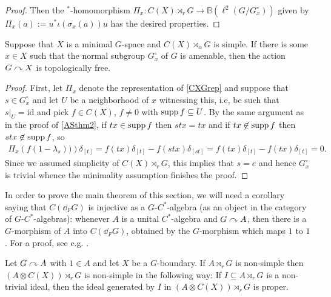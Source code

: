 \begin{proof}
Then the $^*$-homomorphism $\Pi_x \colon C(X) \rtimes_r G \to \mathbb{B}(\ell^2(G/G_x^\circ))$ given by $\Pi_x(a) := u^* \iota(\sigma_x(a)) u $ has the desired properties.
\end{proof}
\begin{proposition}
	Suppose that $X$ is a minimal $G$-space and $C(X) \rtimes_\alpha G$ is simple. If there is some $x \in X$ such that the normal subgroup $G_x^\circ$ of $G$ is amenable, then the action $G \stackrel{ }{\curvearrowright} X$ is topologically free. 
	\label{ozawa15pt2}
\end{proposition}
\begin{proof}
	First, let $\Pi_x$ denote the representation of \cref{CXGrep} and suppose that $s \in G_x^\circ$ and let $U$ be a neighborhood of $x$ witnessing this, i.e, be such that $s|_U = \mathrm{id}$ and pick $f \in C(X)$, $f \neq 0$ with $\operatorname{supp} f \subseteq U$. By the same argument as in the proof of \cref{ASthm2}, if $tx \in \operatorname{supp} f$ then $stx=tx$ and if $tx \not \in \operatorname{supp} f$ then $stx \not \in \operatorname{supp} f$, so
	\begin{align*}
		\Pi_x\left(f ( 1-\lambda_s)) \right) \delta_{[t]} = f(tx) \delta_{[t]} -f(stx) \delta_{[st]} = f(tx) \delta_{[t]} - f(tx)\delta_{[t]} = 0.
	\end{align*}
	Since we assumed simplicity of $C(X) \rtimes_r G$, this implies that $s = e$ and hence $G_x^\circ $ is trivial whence the minimality assumption finishes the proof.
\end{proof}
\begin{note}
	In order to prove the main theorem of this section, we will need a corollary saying that $C(\dd _F G)$ is injective as a $G$-$C^*$-algebra (as an object in the category of $G$-$C^*$-algebras): whenever $A$ is a unital $C^*$-algebra and $G \stackrel{}{\curvearrowright} A$, then there is a $G$-morphism of $A$ into $C(\dd_F G)$, obtained by the $G$-morphism which maps $1$ to $1$. For a proof, see e.g. \cite[Theorem 6 + Corollary 7]{ozawa2014lecture}.
\end{note}
\begin{proposition}
	Let $G \stackrel{}{\curvearrowright} A$ with $1 \in A$ and let $X$ be a $G$-boundary. If $A \rtimes_r G$ is non-simple then $(A \otimes C(X))\rtimes_r G$ is non-simple in the following way: If $I \subseteq A \rtimes_r G$ is a non-trivial ideal, then the ideal generated by $I$ in $(A \otimes C(X))\rtimes_r G$ is proper.
	\label{ozawprop17}
\end{proposition}
